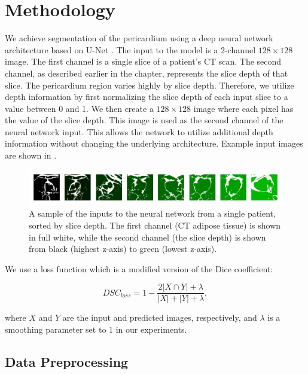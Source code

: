 \section{Methodology}\label{method}

We achieve segmentation of the pericardium using a deep neural network architecture based on U-Net \cite{ronneberger2015unet}. The input to the model is a 2-channel $128 \times 128$ image. The first channel is a single slice of a patient's CT scan. The second channel, as described earlier in the chapter, represents the slice depth of that slice. The pericardium region varies highly by slice depth. Therefore, we utilize depth information by first normalizing the slice depth of each input slice to a value between 0 and 1. We then create a $128 \times 128$ image where each pixel has the value of the slice depth. This image is used as the second channel of the neural network input. This allows the network to utilize additional depth information without changing the underlying architecture. Example input images are shown in .

\begin{figure}[b]
\center
\includegraphics[width=\columnwidth]{images/6/inputs.png}
\caption{A sample of the inputs to the neural network from a single patient, sorted by slice depth. The first channel (CT adipose tissue) is shown in full white, while the second channel (the slice depth) is shown from black (highest z-axis) to green (lowest z-axis). \cite{bencevicEpicardialAdiposeTissue2021}}
\label{fig:input-images}
\end{figure}

We use a loss function which is a modified version of the Dice coefficient:

  \begin{equation}
    \textit{DSC}_{loss} = 1 - \frac {2 \lvert X\cap Y \rvert + \lambda}{\lvert X \rvert + \lvert Y \rvert + \lambda},
    \label{eq:loss}
  \end{equation}
  
where $X$ and $Y$ are the input and predicted images, respectively, and $\lambda$ is a smoothing parameter set to 1 in our experiments.

\subsection{Data Preprocessing}

